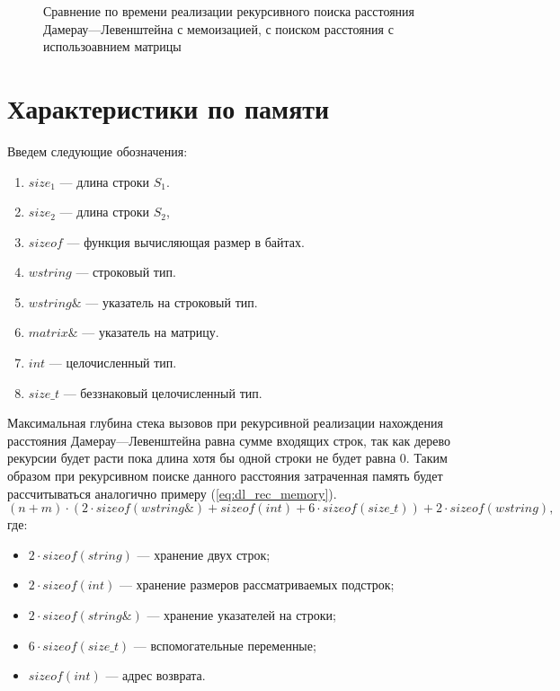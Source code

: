 \begin{figure}[H]
	\centering
	
	\caption{Сравнение по времени реализации рекурсивного поиска расстояния Дамерау---Левенштейна с  мемоизацией, с поиском
	расстояния с использоавнием матрицы}
	\label{plt:time_mat_rec_cmp}
\end{figure}


\section{Характеристики по памяти}

Введем следующие обозначения:
\begin{enumerate}
	\item $size_{1}$ --- длина строки $S_{1}$.
	\item $size_{2}$ --- длина строки $S_{2}$,
	\item $sizeof$ --- функция вычисляющая размер в байтах.
	\item $wstring$ --- строковый тип.
	\item $wstring\&$ --- указатель на строковый тип.
	\item $matrix\&$ --- указатель на матрицу.
	\item $int$ --- целочисленный тип.
	\item $size\_t$ --- беззнаковый целочисленный тип.
\end{enumerate}

Максимальная глубина стека вызовов при рекурсивной реализации нахождения расстояния Дамерау---Левенштейна равна сумме входящих строк,
так как дерево рекурсии будет расти пока длина хотя бы одной строки не будет равна 0. Таким образом при рекурсивном поиске данного расстояния затраченная память
будет рассчитываться  аналогично примеру (\ref{eq:dl_rec_memory}).
\begin{equation}
	\label{eq:dl_rec_memory}
	(n + m) \cdot (2 \cdot sizeof(wstring\&) + sizeof(int) + 6 \cdot sizeof(size\_t)) + 2 \cdot sizeof(wstring),
\end{equation}
где:
\begin{itemize}
	\item $2 \cdot sizeof(string)$ --- хранение двух строк;
	\item $2 \cdot sizeof(int)$ --- хранение размеров рассматриваемых подстрок;
	\item $2 \cdot sizeof(string\&)$ --- хранение указателей на строки;
	\item $6 \cdot sizeof(size\_t)$ --- вспомогательные переменные;
	\item $sizeof(int)$ --- адрес возврата.
\end{itemize}


